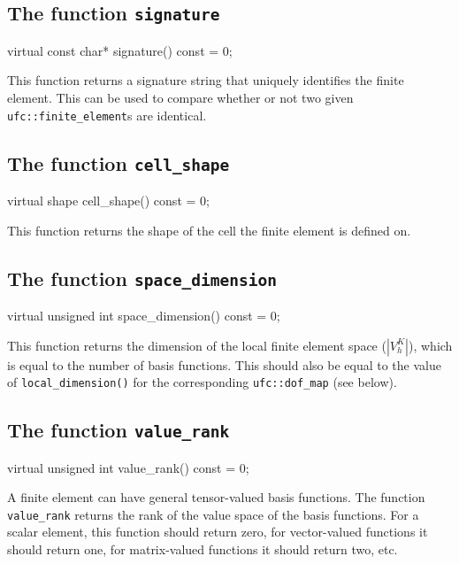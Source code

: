 \subsection{The function \texttt{signature}}

\begin{code}
virtual const char* signature() const = 0;
\end{code}

This function returns a signature string that uniquely identifies the
finite element. This can be used to compare whether or not two given
\texttt{ufc::fi\-nite\_element}s are identical.

\subsection{The function \texttt{cell\_shape}}

\begin{code}
virtual shape cell_shape() const = 0;
\end{code}

This function returns the shape of the cell the finite element is
defined on.

\subsection{The function \texttt{space\_dimension}}

\begin{code}
virtual unsigned int space_dimension() const = 0;
\end{code}

This function returns the dimension of the local finite element space
($|V_h^K|$), which is equal to the number of basis functions. This
should also be equal to the value of \texttt{local\_dimension()} for
the corresponding \texttt{ufc::dof\_map} (see below).

\subsection{The function \texttt{value\_rank}}

\begin{code}
virtual unsigned int value_rank() const = 0;
\end{code}

A finite element can have general tensor-valued basis functions.  The
function \texttt{value\_rank} returns the rank of the value space of
the basis functions. For a scalar element, this function should return
zero, for vector-valued functions it should return one, for
matrix-valued functions it should return two, etc.

